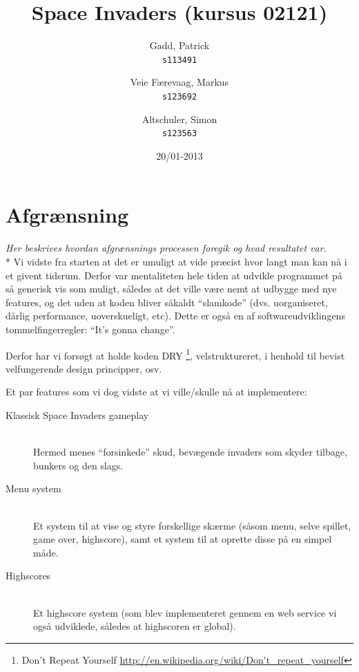 \documentclass[titlepage,danish]{article}
\begin{document}
\title{Space Invaders (kursus 02121)}
\date{20/01-2013}
\author{
  Gadd, Patrick\\
  \texttt{s113491}
  \and
  Veie Færevaag, Markus\\
  \texttt{s123692}
  \and
  Altschuler, Simon\\
  \texttt{s123563}
}
\maketitle

\section{Afgrænsning}
\emph{Her beskrives hvordan afgrænsnings processen foregik og hvad resultatet var.}\\*
Vi vidste fra starten at det er umuligt at vide præcist hvor langt man kan nå i et givent
tidsrum. Derfor var mentaliteten hele tiden at udvikle programmet på så generisk vis som muligt,
således at det ville være nemt at udbygge med nye features, og det uden at koden bliver såkaldt
``slamkode'' (dvs. uorganiseret, dårlig performance, uoverskueligt, etc). Dette er også en af
softwareudviklingens tommelfingerregler: ``It's gonna change''.

Derfor har vi forsøgt at holde koden DRY \footnote{Don't Repeat Yourself
  \url{http://en.wikipedia.org/wiki/Don't_repeat_yourself}}, velstruktureret, i henhold til bevist
velfungerende design principper, osv.

Et par features som vi dog vidste at vi ville/skulle nå at implementere:
\begin{description}
  \item[Klassisk Space Invaders gameplay] \hfill \\
    Hermed menes ``forsinkede'' skud, bevægende invaders som skyder tilbage, bunkers og den slags.

  \item[Menu system] \hfill \\
    Et system til at vise og styre forskellige skærme (såsom menu, selve spillet, game over,
    highscore), samt et system til at oprette disse på en simpel måde.

  \item[Highscores] \hfill \\
    Et highscore system (som blev implementeret gennem en web service vi også udviklede, således at
    highscoren er global).

\end{description}
\end{document}
